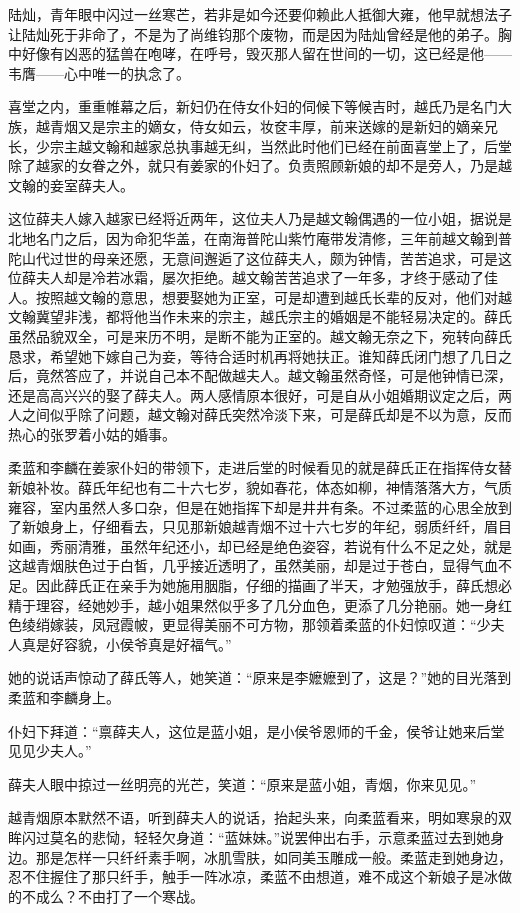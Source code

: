 陆灿，青年眼中闪过一丝寒芒，若非是如今还要仰赖此人抵御大雍，他早就想法子让陆灿死于非命了，不是为了尚维钧那个废物，而是因为陆灿曾经是他的弟子。胸中好像有凶恶的猛兽在咆哮，在呼号，毁灭那人留在世间的一切，这已经是他——韦膺——心中唯一的执念了。

喜堂之内，重重帷幕之后，新妇仍在侍女仆妇的伺候下等候吉时，越氏乃是名门大族，越青烟又是宗主的嫡女，侍女如云，妆奁丰厚，前来送嫁的是新妇的嫡亲兄长，少宗主越文翰和越家总执事越无纠，当然此时他们已经在前面喜堂上了，后堂除了越家的女眷之外，就只有姜家的仆妇了。负责照顾新娘的却不是旁人，乃是越文翰的妾室薛夫人。

这位薛夫人嫁入越家已经将近两年，这位夫人乃是越文翰偶遇的一位小姐，据说是北地名门之后，因为命犯华盖，在南海普陀山紫竹庵带发清修，三年前越文翰到普陀山代过世的母亲还愿，无意间邂逅了这位薛夫人，颇为钟情，苦苦追求，可是这位薛夫人却是冷若冰霜，屡次拒绝。越文翰苦苦追求了一年多，才终于感动了佳人。按照越文翰的意思，想要娶她为正室，可是却遭到越氏长辈的反对，他们对越文翰冀望非浅，都将他当作未来的宗主，越氏宗主的婚姻是不能轻易决定的。薛氏虽然品貌双全，可是来历不明，是断不能为正室的。越文翰无奈之下，宛转向薛氏恳求，希望她下嫁自己为妾，等待合适时机再将她扶正。谁知薛氏闭门想了几日之后，竟然答应了，并说自己本不配做越夫人。越文翰虽然奇怪，可是他钟情已深，还是高高兴兴的娶了薛夫人。两人感情原本很好，可是自从小姐婚期议定之后，两人之间似乎除了问题，越文翰对薛氏突然冷淡下来，可是薛氏却是不以为意，反而热心的张罗着小姑的婚事。

柔蓝和李麟在姜家仆妇的带领下，走进后堂的时候看见的就是薛氏正在指挥侍女替新娘补妆。薛氏年纪也有二十六七岁，貌如春花，体态如柳，神情落落大方，气质雍容，室内虽然人多口杂，但是在她指挥下却是井井有条。不过柔蓝的心思全放到了新娘身上，仔细看去，只见那新娘越青烟不过十六七岁的年纪，弱质纤纤，眉目如画，秀丽清雅，虽然年纪还小，却已经是绝色姿容，若说有什么不足之处，就是这越青烟肤色过于白皙，几乎接近透明了，虽然美丽，却是过于苍白，显得气血不足。因此薛氏正在亲手为她施用胭脂，仔细的描画了半天，才勉强放手，薛氏想必精于理容，经她妙手，越小姐果然似乎多了几分血色，更添了几分艳丽。她一身红色绫绡嫁装，凤冠霞帔，更显得美丽不可方物，那领着柔蓝的仆妇惊叹道：“少夫人真是好容貌，小侯爷真是好福气。”

她的说话声惊动了薛氏等人，她笑道：“原来是李嬷嬷到了，这是？”她的目光落到柔蓝和李麟身上。

仆妇下拜道：“禀薛夫人，这位是蓝小姐，是小侯爷恩师的千金，侯爷让她来后堂见见少夫人。”

薛夫人眼中掠过一丝明亮的光芒，笑道：“原来是蓝小姐，青烟，你来见见。”

越青烟原本默然不语，听到薛夫人的说话，抬起头来，向柔蓝看来，明如寒泉的双眸闪过莫名的悲恸，轻轻欠身道：“蓝妹妹。”说罢伸出右手，示意柔蓝过去到她身边。那是怎样一只纤纤素手啊，冰肌雪肤，如同美玉雕成一般。柔蓝走到她身边，忍不住握住了那只纤手，触手一阵冰凉，柔蓝不由想道，难不成这个新娘子是冰做的不成么？不由打了一个寒战。

